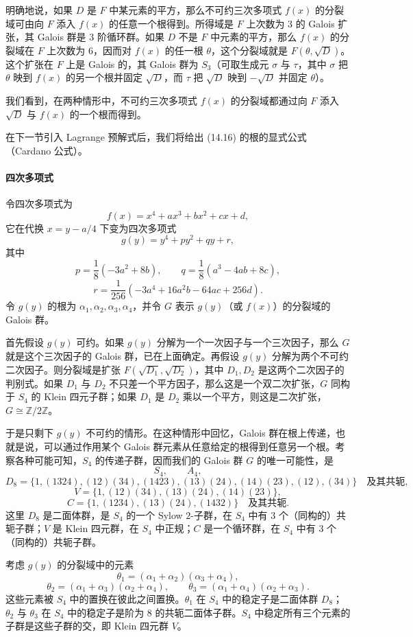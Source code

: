 明确地说，如果 $D$ 是 $F$ 中某元素的平方，那么不可约三次多项式 $f(x)$ 的分裂域可由向 $F$ 添入 $f(x)$ 的任意一个根得到。所得域是 $F$ 上次数为 $3$ 的 Galois 扩张，其 Galois 群是 $3$ 阶循环群。如果 $D$ 不是 $F$ 中元素的平方，那么 $f(x)$ 的分裂域在 $F$ 上次数为 $6$，因而对 $f(x)$ 的任一根 $\theta$，这个分裂域就是 $F(\theta,\sqrt D)$。这个扩张在 $F$ 上是 Galois 的，其 Galois 群为 $S_3$（可取生成元 $\sigma$ 与 $\tau$，其中 $\sigma$ 把 $\theta$ 映到 $f(x)$ 的另一个根并固定 $\sqrt D$，而 $\tau$ 把 $\sqrt D$ 映到 $-\sqrt D$ 并固定 $\theta$）。

我们看到，在两种情形中，不可约三次多项式 $f(x)$ 的分裂域都通过向 $F$ 添入 $\sqrt D$ 与 $f(x)$ 的一个根而得到。

在下一节引入 Lagrange 预解式后，我们将给出 (14.16) 的根的显式公式（Cardano 公式）。

\paragraph{四次多项式}
令四次多项式为
\[
f(x)=x^4+ax^3+bx^2+cx+d,
\]
它在代换 $x=y-a/4$ 下变为四次多项式
\[
g(y)=y^4+py^2+qy+r,
\]
其中
\[
p=\frac{1}{8}(-3a^2+8b),
\qquad
q=\frac{1}{8}(a^3-4ab+8c),
\]
\[
r=\frac{1}{256}(-3a^4+16a^2b-64ac+256d).
\]
令 $g(y)$ 的根为 $\alpha_1,\alpha_2,\alpha_3,\alpha_4$，并令 $G$ 表示 $g(y)$（或 $f(x)$）的分裂域的 Galois 群。

首先假设 $g(y)$ 可约。如果 $g(y)$ 分解为一个一次因子与一个三次因子，那么 $G$ 就是这个三次因子的 Galois 群，已在上面确定。再假设 $g(y)$ 分解为两个不可约二次因子。则分裂域是扩张 $F(\sqrt{D_1},\sqrt{D_2})$，其中 $D_1,D_2$ 是这两个二次因子的判别式。如果 $D_1$ 与 $D_2$ 不只差一个平方因子，那么这是一个双二次扩张，$G$ 同构于 $S_4$ 的 Klein 四元子群；如果 $D_1$ 是 $D_2$ 乘以一个平方，则这是二次扩张，$G\cong \mathbb Z/2\mathbb Z$。

于是只剩下 $g(y)$ 不可约的情形。在这种情形中回忆，Galois 群在根上传递，也就是说，可以通过作用某个 Galois 群元素从任意给定的根得到任意另一个根。考察各种可能可知，$S_4$ 的传递子群，因而我们的 Galois 群 $G$ 的唯一可能性，是
\[
S_4,
\qquad A_4,
\]
\[
D_8=\{1,(1324),(12)(34),(1423),(13)(24),(14)(23),(12),(34)\}
\quad\text{及其共轭},
\]
\[
V=\{1,(12)(34),(13)(24),(14)(23)\},
\]
\[
C=\{1,(1234),(13)(24),(1432)\}\quad\text{及其共轭}.
\]
这里 $D_8$ 是二面体群，是 $S_4$ 的一个 Sylow $2$-子群，在 $S_4$ 中有 $3$ 个（同构的）共轭子群；$V$ 是 Klein 四元群，在 $S_4$ 中正规；$C$ 是一个循环群，在 $S_4$ 中有 $3$ 个（同构的）共轭子群。

考虑 $g(y)$ 的分裂域中的元素
\[
\theta_1=(\alpha_1+\alpha_2)(\alpha_3+\alpha_4),
\]
\[
\theta_2=(\alpha_1+\alpha_3)(\alpha_2+\alpha_4),
\qquad
\theta_3=(\alpha_1+\alpha_4)(\alpha_2+\alpha_3).
\]
这些元素被 $S_4$ 中的置换在彼此之间置换。$\theta_1$ 在 $S_4$ 中的稳定子是二面体群 $D_8$；$\theta_2$ 与 $\theta_3$ 在 $S_4$ 中的稳定子是阶为 $8$ 的共轭二面体子群。$S_4$ 中稳定所有三个元素的子群是这些子群的交，即 Klein 四元群 $V$。

